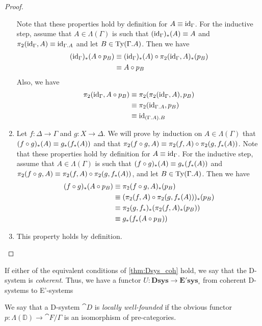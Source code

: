 \begin{proof}
\begin{enumerate}[label=(\alph*)]
Note that these properties hold by definition for $A\equiv{\mathrm{id}_{\Gamma}}$. For the
inductive step, assume that $A\in\Lambda(\Gamma)$ is such that
$({\mathrm{id}_{\Gamma}})_\ast(A)\equiv A$ and $\pi_2(\catid{\Gamma},A)\jdeq
\catid{\ctxext{\Gamma}{A}}$ and let $B\in\mathrm{Ty}(\ctxext{\Gamma}{A})$. Then
we have
\begin{align*}
({\mathrm{id}_{\Gamma}})_\ast(A\circ p_B) & \equiv ({\mathrm{id}_{\Gamma}})_\ast(A)\circ \pi_2({\mathrm{id}_{\Gamma}},A)_\ast(p_B) \\
& \equiv A\circ p_B
\end{align*}
Also, we have
\begin{align*}
\pi_2(\catid{\Gamma},A\circ p_B) & \jdeq \pi_2(\pi_2(\catid{\Gamma},A),p_B) \\
& \jdeq \pi_2(\catid{\ctxext{\Gamma}{A}},p_B) \\
& \jdeq \catid{\ctxext{{\Gamma}{A}}{B}}
\end{align*}
\item Let $f:\Delta\to \Gamma$ and $g:X\to \Delta$. We will prove by induction
on $A\in\Lambda(\Gamma)$ that $(f\circ g)_\ast(A)\equiv g_\ast(f_\ast(A))$ and
that $\pi_2(f\circ g,A)\equiv \pi_2(f,A)\circ \pi_2(g,f_\ast(A))$. Note that
these properties hold by definition for $A\equiv{\mathrm{id}_{\Gamma}}$. For the inductive
step, assume that $A\in\Lambda(\Gamma)$ is such that $(f\circ g)_\ast(A)\equiv g_\ast(f_\ast(A))$ and
$\pi_2(f\circ g,A)\equiv \pi_2(f,A)\circ \pi_2(g,f_\ast(A))$, and let
$B\in\mathrm{Ty}(\ctxext{\Gamma}{A})$. Then we have
\begin{align*}
(f\circ g)_\ast(A\circ p_B) & \equiv \pi_2(f\circ g,A)_\ast(p_B) \\
& \equiv (\pi_2(f,A)\circ\pi_2(g,f_\ast(A)))_\ast(p_B) \\
& \equiv \pi_2(g,f_\ast)_\ast(\pi_2(f,A)_\ast(p_B)) \\
& \equiv g_\ast(f_\ast(A\circ p_B))
\end{align*}
\item This property holds by definition.\qedhere
\end{enumerate}
\end{proof}

\begin{defn}
If either of the equivalent conditions of \autoref{thm:Dsys_coh} hold, we say 
that the D-system is \emph{coherent}. Thus, we have a functor
$U:\mathbf{Dsys}\to\mathbf{E'sys_{\circ}}$ from coherent D-systems to E'-systems
\end{defn}

\begin{defn}
We say that a D-system $\cat{D}$ is \emph{locally well-founded} if the obvious functor
$p:\Lambda(\mathbb{D})\to\cat{F}/\Gamma$ is an isomorphism of pre-categories.
\end{defn}

